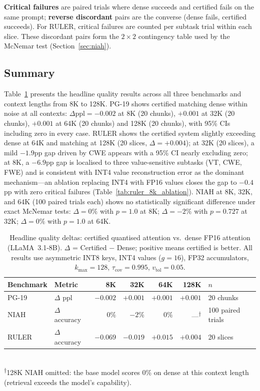 \documentclass[10pt,twocolumn,a4paper]{article}
\theoremstyle{definition}
\theoremstyle{remark}
\begin{document}
\textbf{Critical failures} are paired trials where dense succeeds and certified fails on the same prompt; \textbf{reverse discordant} pairs are the converse (dense fails, certified succeeds).  For RULER, critical failures are counted per subtask trial within each slice.  These discordant pairs form the $2\times 2$ contingency table used by the McNemar test (Section~\ref{sec:niah}).

\subsection{Summary}

Table~\ref{tab:summary} presents the headline quality results across all three benchmarks and context lengths from 8K to 128K.  PG-19 shows certified matching dense within noise at all contexts: $\Delta\mathrm{ppl}{=}{-}0.002$ at 8K (20 chunks), $+0.001$ at 32K (20 chunks), $+0.001$ at 64K (20 chunks) and 128K (20 chunks), with 95\% CIs including zero in every case.  RULER shows the certified system slightly exceeding dense at 64K and matching at 128K (20 slices, $\Delta{=}{+}0.004$); at 32K (20 slices), a mild $-1.9$pp gap driven by CWE appears with a 95\% CI nearly excluding zero; at 8K, a $-6.9$pp gap is localised to three value-sensitive subtasks (VT, CWE, FWE) and is consistent with INT4 value reconstruction error as the dominant mechanism---an ablation replacing INT4 with FP16 values closes the gap to $-0.4$pp with zero critical failures (Table~\ref{tab:ruler_8k_ablation}).  NIAH at 8K, 32K, and 64K (100 paired trials each) shows no statistically significant difference under exact McNemar tests: $\Delta{=}0\%$ with $p{=}1.0$ at 8K; $\Delta{=}{-}2\%$ with $p{=}0.727$ at 32K; $\Delta{=}0\%$ with $p{=}1.0$ at 64K.

\begin{table}[!t]
\centering
\caption{Headline quality deltas: certified quantised attention vs.\ dense FP16 attention (LLaMA~3.1-8B).  $\Delta$ = Certified $-$ Dense; positive means certified is better.  All results use asymmetric INT8 keys, INT4 values ($g{=}16$), FP32 accumulators, $k_{\max}{=}128$, $\tau_{\mathrm{cov}}{=}0.995$, $v_{\mathrm{tol}}{=}0.05$.}
\label{tab:summary}
\small
\begin{tabular}{llrrrrl}
\toprule
\textbf{Benchmark} & \textbf{Metric} & \textbf{8K} & \textbf{32K} & \textbf{64K} & \textbf{128K} & \textbf{$n$} \\
\midrule
PG-19 & $\Delta$ ppl & $-0.002$ & $+0.001$ & $+0.001$ & $+0.001$ & 20 chunks \\
NIAH & $\Delta$ accuracy & $0\%$ & $-2\%$ & $0\%$ & ---\textsuperscript{$\dagger$} & 100 paired trials \\
RULER & $\Delta$ accuracy & $-0.069$ & $-0.019$ & $+0.015$ & $+0.004$ & 20 slices \\
\bottomrule
\end{tabular}
\\[2pt]
{\footnotesize \textsuperscript{$\dagger$}128K NIAH omitted: the base model scores 0\% on dense at this context length (retrieval exceeds the model's capability).}
\end{table}
\end{document}
